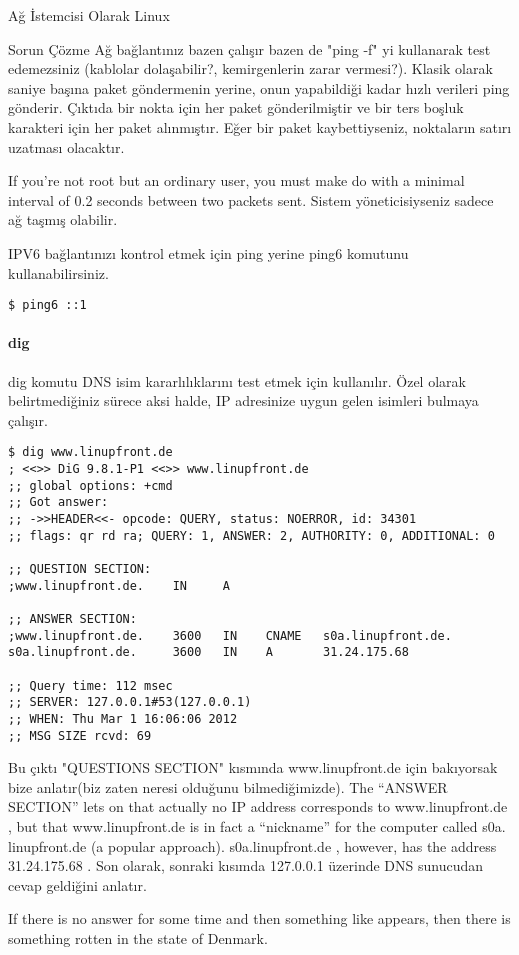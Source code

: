 \begin{section}{Ağ İstemcisi Olarak Linux}
\begin{subsection}{Sorun Çözme}
Ağ bağlantınız bazen çalışır bazen de "ping -f" yi kullanarak test edemezsiniz (kablolar dolaşabilir?, kemirgenlerin zarar vermesi?). Klasik olarak saniye başına paket göndermenin yerine, onun yapabildiği kadar hızlı verileri  ping gönderir. Çıktıda bir nokta için her paket gönderilmiştir ve bir ters boşluk karakteri için her paket alınmıştır. Eğer bir paket kaybettiyseniz, noktaların satırı uzatması olacaktır.

If you’re not root but an ordinary user, you must make do with a minimal interval of 0.2 seconds between two packets sent. Sistem yöneticisiyseniz sadece ağ taşmış olabilir.

IPV6 bağlantınızı kontrol etmek için ping yerine ping6 komutunu kullanabilirsiniz. 
\begin{verbatim}
$ ping6 ::1
\end{verbatim}

\paragraph{dig}{dig komutu DNS isim kararlılıklarını test etmek için kullanılır. Özel olarak belirtmediğiniz sürece aksi halde, IP adresinize uygun gelen isimleri bulmaya çalışır.}
\begin{verbatim}
$ dig www.linupfront.de
; <<>> DiG 9.8.1-P1 <<>> www.linupfront.de
;; global options: +cmd
;; Got answer:
;; ->>HEADER<<- opcode: QUERY, status: NOERROR, id: 34301
;; flags: qr rd ra; QUERY: 1, ANSWER: 2, AUTHORITY: 0, ADDITIONAL: 0

;; QUESTION SECTION:
;www.linupfront.de.    IN     A

;; ANSWER SECTION:
;www.linupfront.de.    3600   IN    CNAME   s0a.linupfront.de.
s0a.linupfront.de.     3600   IN    A       31.24.175.68

;; Query time: 112 msec
;; SERVER: 127.0.0.1#53(127.0.0.1)
;; WHEN: Thu Mar 1 16:06:06 2012
;; MSG SIZE rcvd: 69
\end{verbatim}

Bu çıktı "QUESTIONS SECTION" kısmında www.linupfront.de için bakıyorsak bize anlatır(biz zaten neresi olduğunu bilmediğimizde). The “ANSWER SECTION” lets on that actually no IP address corresponds to www.linupfront.de , but that www.linupfront.de is in fact a “nickname” for the computer called s0a. linupfront.de (a popular approach). s0a.linupfront.de , however, has the address 31.24.175.68 . Son olarak, sonraki kısımda 127.0.0.1 üzerinde DNS sunucudan cevap geldiğini anlatır. 

If there is no answer for some time and then something like appears, then there is something rotten in the state of Denmark.


\end{subsection}
\end{section}

